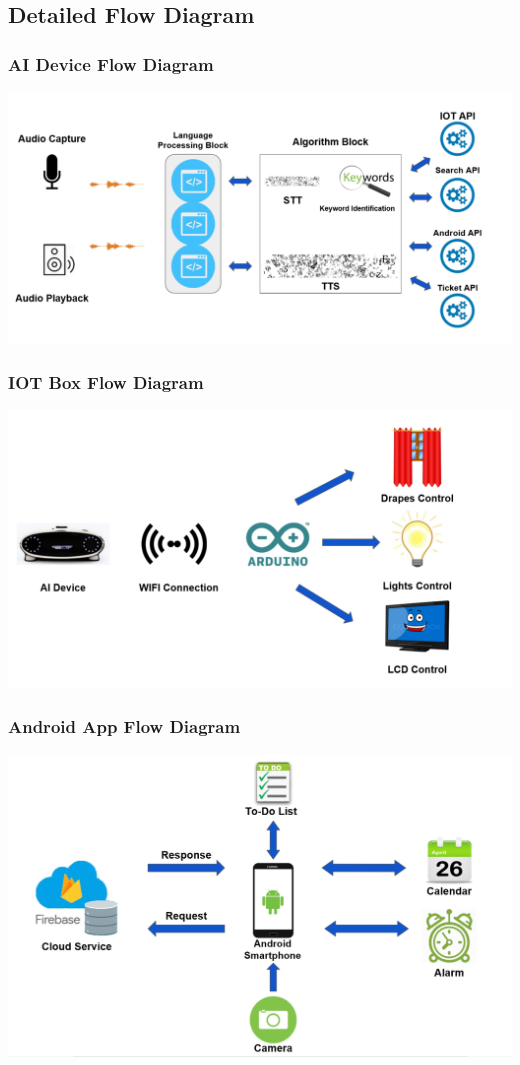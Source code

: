 \documentclass[xcolor=dvipsnames]{beamer}
\begin{document}
\subsection*{Detailed Flow Diagram}
\begin{frame}
\frametitle{AI Device Flow Diagram}
\begin{minipage}{0.8\textwidth}
\centering 
\includegraphics[scale=0.36]{images/Device.png}
\end{minipage}
\end{frame}
\begin{frame}
\frametitle{IOT Box Flow Diagram}
\centering
\includegraphics[scale=0.35]{images/IOT.png}
\end{frame}
\begin{frame}
\frametitle{Android App Flow Diagram}
\includegraphics[scale=0.4]{images/android.png}
\end{frame}
\end{document}

